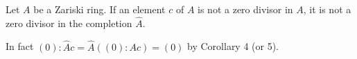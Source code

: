 Let $A$ be a Zariski ring. If an element $c$ of $A$ is not a zero divisor in $A$, it is not a zero divisor in the completion $\hat{A}$.

In fact $(0):\hat{A}c = \hat{A}((0):Ac) = (0)$ by Corollary 4 (or 5).